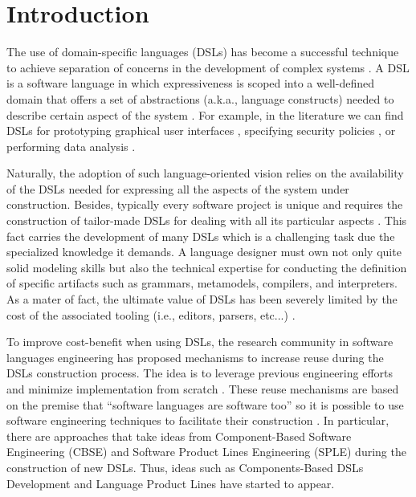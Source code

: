 \section{Introduction}
\label{sec:introduction}

The use of domain-specific languages (DSLs) has become a successful technique to achieve separation of concerns in the development of complex systems \cite{Cook:2006}. A DSL is a software language in which expressiveness is scoped into a well-defined domain that offers a set of abstractions (a.k.a., language constructs) needed to describe certain aspect of the system \cite{Combemale:2014}. For example, in the literature we can find DSLs for prototyping graphical user interfaces \cite{Oney:2012}, specifying security policies \cite{Lodderstedt:2002}, or performing data analysis \cite{Eberius:2012}. 

Naturally, the adoption of such language-oriented vision relies on the availability of the DSLs needed for expressing all the aspects of the system under construction. Besides, typically every software project is unique and requires the construction of tailor-made DSLs for dealing with all its particular aspects \cite{Clark:2013}. This fact carries the development of many DSLs which is a challenging task due the specialized knowledge it demands. A language designer must own not only quite solid modeling skills but also the technical expertise for conducting the definition of specific artifacts such as grammars, metamodels, compilers, and interpreters. As a mater of fact, the ultimate value of DSLs has been severely limited by the cost of the associated tooling (i.e., editors, parsers, etc...) \cite{jezequel:2014}.

To improve cost-benefit when using DSLs, the research community in software languages engineering has proposed mechanisms to increase reuse during the DSLs construction process. The idea is to leverage previous engineering efforts and minimize implementation from scratch \cite{Storm:2013}. These reuse mechanisms are based on the premise that ``software languages are software too'' \cite{Favre:2011} so it is possible to use software engineering techniques to facilitate their construction \cite{Kleppe:2009}. In particular, there are approaches that take ideas from Component-Based Software Engineering (CBSE) and Software Product Lines Engineering (SPLE) during the construction of new DSLs. Thus, ideas such as Components-Based DSLs Development\cite{Cleenewerck:2003} and Language Product Lines \cite{Zschaler:2010} have started to appear.

